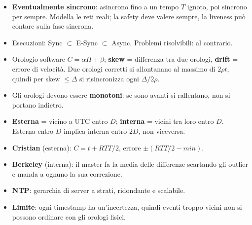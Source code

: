 \begin{itemize}
\tightlist
\item
  \textbf{Eventualmente sincrono}: asincrono fino a un tempo \(T\) ignoto, poi sincrono per sempre. Modella le reti reali; la safety deve valere sempre, la liveness può contare sulla fase sincrona.
\item
  Esecuzioni: Sync \(\subset\) E-Sync \(\subset\) Async. Problemi risolvibili: al contrario.
\item
  Orologio software \(C = \alpha H + \beta\); \textbf{skew} = differenza tra due orologi, \textbf{drift} = errore di velocità. Due orologi corretti si allontanano al massimo di \(2\rho t\), quindi per skew \(\le \Delta\) si risincronizza ogni \(\Delta / 2\rho\).
\item
  Gli orologi devono essere \textbf{monotoni}: se sono avanti si rallentano, non si portano indietro.
\item
  \textbf{Esterna} = vicino a UTC entro \(D\); \textbf{interna} = vicini tra loro entro \(D\). Esterna entro \(D\) implica interna entro \(2D\), non viceversa.
\item
  \textbf{Cristian} (esterna): \(C = t + RTT/2\), errore \(\pm(RTT/2 - min)\).
\item
  \textbf{Berkeley} (interna): il master fa la media delle differenze scartando gli outlier e manda a ognuno la sua correzione.
\item
  \textbf{NTP}: gerarchia di server a strati, ridondante e scalabile.
\item
  \textbf{Limite}: ogni timestamp ha un'incertezza, quindi eventi troppo vicini non si possono ordinare con gli orologi fisici.
\end{itemize}
